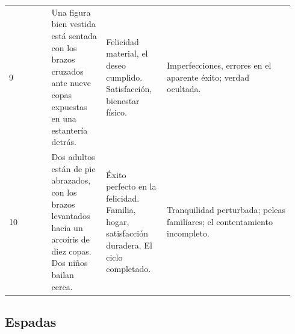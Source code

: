 \begin{longtable}[]{@{}>{\RaggedRight\small}p{0.14\linewidth}>{\RaggedRight\small}p{0.18\linewidth}>{\RaggedRight\small}p{0.20\linewidth}>{\RaggedRight\small}p{0.42\linewidth}@{}}
9 & Una figura bien vestida está sentada con los brazos cruzados ante nueve copas expuestas en una estantería detrás. & Felicidad material, el deseo cumplido. Satisfacción, bienestar físico. & Imperfecciones, errores en el aparente éxito; verdad ocultada. \\
10 & Dos adultos están de pie abrazados, con los brazos levantados hacia un arcoíris de diez copas. Dos niños bailan cerca. & Éxito perfecto en la felicidad. Familia, hogar, satisfacción duradera. El ciclo completado. & Tranquilidad perturbada; peleas familiares; el contentamiento incompleto. \\
\end{longtable}

\subsection{Espadas}\label{swords}

